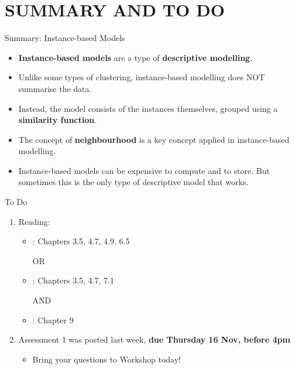 \documentclass[handout]{beamer}
\newcommand{\strong}[1]{\textbf{\color{teal} #1}}
\newcommand{\stronger}[1]{\textbf{\color{purple} #1}}
\begin{document}
\section*{SUMMARY AND TO DO}
\begin{frame}{Summary: Instance-based Models}
\begin{itemize}
\item \stronger{Instance-based models} are a type of \strong{descriptive modelling}.
\item Unlike some types of clustering, instance-based modelling does NOT summarise the data.
\item Instead, the model consists of the instances themselves, grouped using a \strong{similarity function}.
\item The concept of \strong{neighbourhood} is a key concept applied in instance-based modelling.
\item Instance-based models can be expensive to compute and to store. But sometimes this is the only type of descriptive model that works.
\end{itemize}
\end{frame}
\begin{frame}{To Do}
\begin{enumerate}
\item Reading:
	\begin{itemize}
	\item \cite{WFH3:2011}: Chapters 3.5, 4.7, 4.9, 6.5
	\item[OR]
	\item \cite{WFH4:2016}: Chapters 3.5, 4.7, 7.1
	\item[AND]
	\item \cite{LB3:2011}: Chapter 9
	\end{itemize}
\item Assessment 1 was posted last week, \textbf{due Thursday 16 Nov, before 4pm}
	\begin{itemize}
	\item Bring your questions to Workshop today!
	\end{itemize}
\end{enumerate}
\end{frame}
\end{document}
